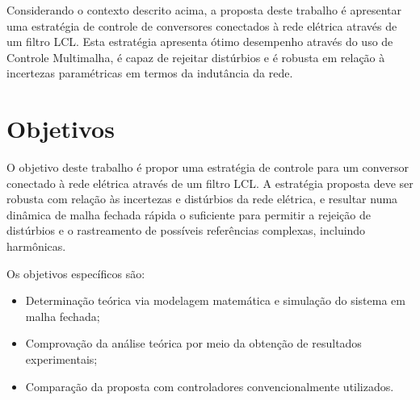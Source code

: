 	Considerando o contexto descrito acima, a proposta deste trabalho é apresentar
	uma estratégia de controle de conversores conectados à rede elétrica através de
	um filtro LCL. Esta estratégia apresenta ótimo desempenho através do uso de
	Controle Multimalha, é capaz de rejeitar distúrbios e é robusta em relação à
	incertezas paramétricas em termos da indutância da rede.








\section*{Objetivos}

	O objetivo deste trabalho é propor uma estratégia de controle para um conversor
	conectado à rede elétrica através de um filtro LCL. A estratégia proposta deve
	ser robusta com relação às incertezas e distúrbios da rede elétrica, e resultar
	numa dinâmica de malha fechada rápida o suficiente para permitir a rejeição de
	distúrbios e o rastreamento de possíveis referências complexas, incluindo harmônicas.

	Os objetivos específicos são:

	\begin{itemize}
		\item Determinação teórica via modelagem matemática e simulação do sistema
			em malha fechada;
		\item Comprovação da análise teórica por meio da obtenção de resultados
			experimentais;
		\item Comparação da proposta com controladores convencionalmente utilizados.
	\end{itemize}

